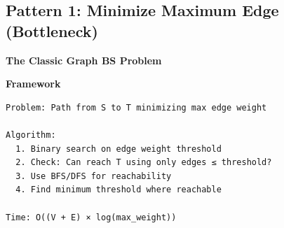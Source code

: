 \documentclass[11pt,a4paper,oneside]{book}
\begin{document}
\subsection{Pattern 1: Minimize Maximum Edge (Bottleneck)}

\begin{tcolorbox}[
    enhanced,breakable,
    colback=successgreen!10,
    colframe=successgreen,
    boxrule=1.5pt,
    arc=3mm,
    title=\textbf{Complete Bottleneck Path Algorithms}
]
\textbf{The Classic Graph BS Problem}

\textbf{Framework}
\begin{verbatim}
Problem: Path from S to T minimizing max edge weight

Algorithm:
  1. Binary search on edge weight threshold
  2. Check: Can reach T using only edges ≤ threshold?
  3. Use BFS/DFS for reachability
  4. Find minimum threshold where reachable

Time: O((V + E) × log(max_weight))
\end{verbatim}
\end{tcolorbox}
\end{document}

